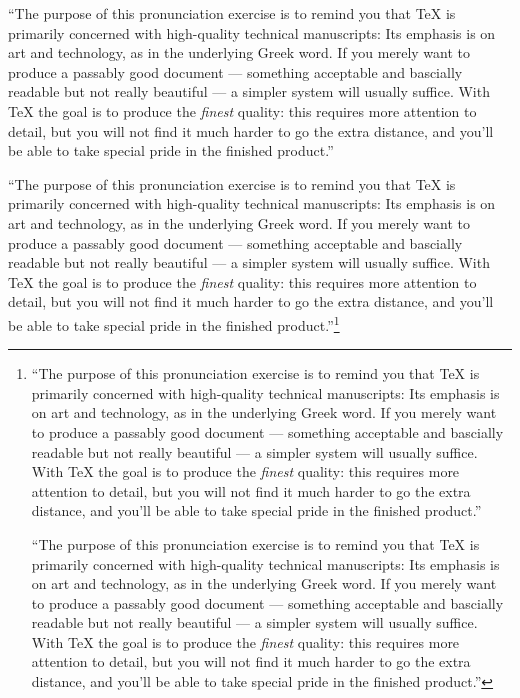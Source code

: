 \documentclass[a5paper]{scrartcl}
\newcommand*{\Test}{%
   \rmfamily
   ``The purpose of this pronunciation exercise is to remind you that
     \TeX{} is primarily concerned with high-quality technical
     manuscripts: Its emphasis is on art and technology, as in the
     underlying Greek word.
     If you merely want to produce a passably good document ---
     something acceptable and bascially readable but not really
     beautiful --- a simpler system will usually suffice.
     With \TeX{} the goal is to produce the \textsl{finest} quality:
     this requires more attention to detail, but you will not find it
     much harder to go the extra distance, and you'll be able to take
     special pride in the finished product.''\par
   \ttfamily
   ``The purpose of this pronunciation exercise is to remind you that
     \TeX{} is primarily concerned with high-quality technical
     manuscripts: Its emphasis is on art and technology, as in the
     underlying Greek word.
     If you merely want to produce a passably good document ---
     something acceptable and bascially readable but not really
     beautiful --- a simpler system will usually suffice.
     With \TeX{} the goal is to produce the \textsl{finest} quality:
     this requires more attention to detail, but you will not find it
     much harder to go the extra distance, and you'll be able to take
     special pride in the finished product.''}
\begin{document}
\Test\footnote{\Test}
\end{document}
